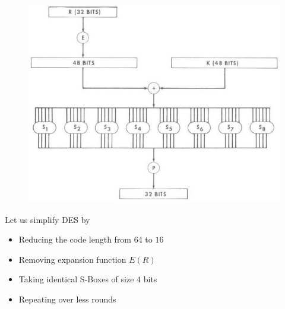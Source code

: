 \documentclass[9pt]{beamer}
\begin{document}
\begin{frame}
\begin{columns}
\begin{column}{0.6\textwidth}
\begin{figure}
\includegraphics[totalheight=0.5\textheight]{des_feistel.jpg}
\end{figure}
\pause Let us simplify DES by
\begin{itemize}[<+->]
\item{Reducing the code length from $64$ to $16$}
\item{Removing expansion function $E(R)$}
\item{Taking identical S-Boxes of size $4$ bits}
\item{Repeating over less rounds}
\end{itemize}
\end{column}


\end{columns}
\end{frame}
\end{document}
